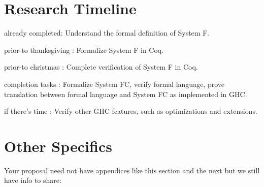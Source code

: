 \documentclass{sig-alternate}
\begin{document}
\section{Research Timeline}
\label{sec:research_timeline}
\begin{itemize*}
	\item {\sc already completed}: Understand the formal definition of System F.
	\item {\sc prior-to thanksgiving} : Formalize System F in Coq.
	\item {\sc prior-to christmas} : Complete verification of System F in Coq.
	\item {\sc completion tasks} : Formalize System FC, verify formal language, prove translation between formal language and System FC as implemented in GHC.
	\item {\sc if there's time} : Verify other GHC features, such as optimizations and extensions.
\end{itemize*}


\vspace{175pt}

\appendix
\section{Other Specifics}
\label{app:other_specifics}
Your proposal need not have appendices like this section and the next
but we still have info to share:

\end{document}
